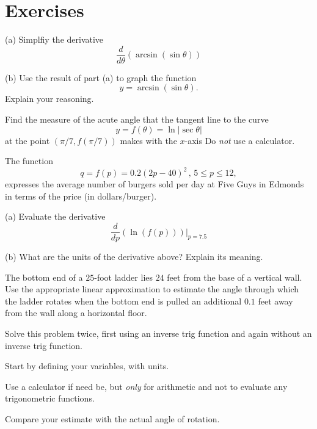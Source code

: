 \documentclass{ximera}
\begin{document}
\section*{Exercises}

\begin{question}  \label{Qfdgtnn}
(a) Simplfiy the derivative
\[
     \frac{d}{d\theta}\left(  \arcsin(\sin \theta) \right)
\]

(b) Use the result of part (a) to graph the function
\[
        y = \arcsin (\sin\theta) .
\] 
Explain your reasoning.
\end{question}

\begin{question} \label{QWcsdefv3e354}
Find the measure of the acute angle that the tangent line to the curve
\[
      y = f(\theta) = \ln |\sec\theta|
\]
at the point $(\pi/7, f(\pi/7))$ makes with the $x$-axis Do \emph{not} use a calculator.
\end{question}


\begin{question}   \label{QDfd6mbqs}
The function
\[
       q = f(p) = 0.2 \left( 2p-40 \right)^2 \, , \, 5\leq p \leq 12 ,
\]
expresses the average number of burgers sold per day at Five Guys in Edmonds in terms of the price (in dollars/burger).

(a) Evaluate the derivative
\[
        \frac{d}{dp} \left(  \ln (f(p)) \right)\Big|_{p=7.5}
\]

(b) What are the units of the derivative above? Explain its meaning.
\end{question}


\begin{question}  \label{Q:3e4fg45534}
The bottom end of a $25$-foot ladder lies $24$ feet from the base of a vertical wall. Use the appropriate linear approximation to estimate the angle through which the ladder rotates when the bottom end is pulled an additional $0.1$ feet away from the wall along a horizontal floor. 

Solve this problem twice, first using an inverse trig function and again without an inverse trig function. 

Start by defining your variables, with units.

Use a calculator if need be, but \emph{only} for arithmetic and not to evaluate any trigonometric functions.

Compare your estimate with the actual angle of rotation.

\end{question}
\end{document}
